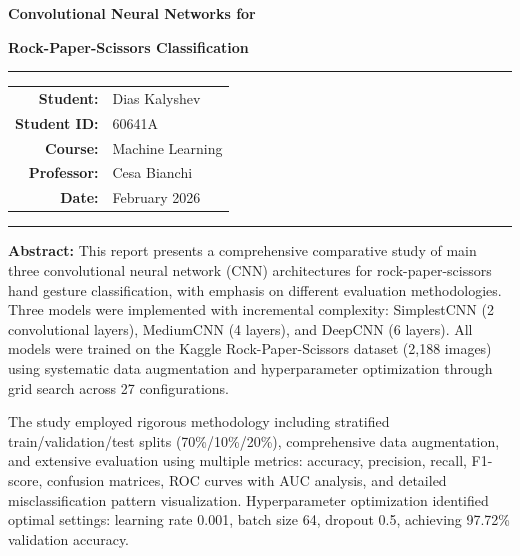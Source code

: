 \documentclass[12pt,a4paper]{article}
\begin{document}
\begin{titlepage}
\centering
\vspace*{2cm}

{\huge\textbf{Convolutional Neural Networks for}\par}
\vspace{0.5cm}
{\huge\textbf{Rock-Paper-Scissors Classification}\par}
\vspace{1cm}


\vspace{2cm}
\rule{\textwidth}{0.5pt}
\vspace{0.5cm}

{\large
\begin{tabular}{rl}
\textbf{Student:} & Dias Kalyshev \\[0.2cm]
\textbf{Student ID:} & 60641A \\[0.2cm]
\textbf{Course:} & Machine Learning  \\[0.2cm]
\textbf{Professor:} & Cesa Bianchi \\[0.2cm]
\textbf{Date:} & February 2026 \\
\end{tabular}
}

\vspace{0.5cm}
\rule{\textwidth}{0.5pt}

\vfill

\begin{minipage}{0.9\textwidth}
\setlength{\parindent}{0pt}
\setlength{\parskip}{0.5em}

\textbf{Abstract:} This report presents a comprehensive comparative study of main three convolutional neural network (CNN) architectures for rock-paper-scissors hand gesture classification, with emphasis on different evaluation methodologies. Three models were implemented with incremental complexity: SimplestCNN (2 convolutional layers), MediumCNN (4 layers), and DeepCNN (6 layers). All models were trained on the Kaggle Rock-Paper-Scissors dataset (2,188 images) using systematic data augmentation and hyperparameter optimization through grid search across 27 configurations.

The study employed rigorous methodology including stratified train/validation/test splits (70\%/10\%/20\%), comprehensive data augmentation, and extensive evaluation using multiple metrics: accuracy, precision, recall, F1-score, confusion matrices, ROC curves with AUC analysis, and detailed misclassification pattern visualization. Hyperparameter optimization identified optimal settings: learning rate 0.001, batch size 64, dropout 0.5, achieving 97.72\% validation accuracy.


\end{minipage}
\end{titlepage}
\end{document}
